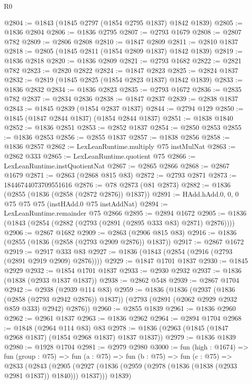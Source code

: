 \begin{lexlean}{R0}
\begin{coremodule}
@2804 := @1843 (@1845 @2797 (@1854 @2795 @1837) @1842 @1839)
@2805 := @1836 @2804
@2806 := @1836 @2795
@2807 := @2793 @1679
@2808 := @2807 @782
@2809 := @2806 @2808
@2810 := @1847 @2809
@2811 := @2810 @1837
@2818 := @2805 (@1845 @2811 (@1854 @2809 @1837) @1842 @1839)
@2819 := @1836 @2818
@2820 := @1836 @2809
@2821 := @2793 @1682
@2822 := @2821 @782
@2823 := @2820 @2822
@2824 := @1847 @2823
@2825 := @2824 @1837
@2832 := @2819 (@1845 @2825 (@1854 @2823 @1837) @1842 @1839)
@2833 := @1836 @2832
@2834 := @1836 @2823
@2835 := @2793 @1672
@2836 := @2835 @782
@2837 := @2834 @2836
@2838 := @1847 @2837
@2839 := @2838 @1837
@2843 := @1845 @2839 (@1854 @2837 @1837)
@2844 := @2794 @129
@2850 := @1845 (@1847 @2844 @1837) (@1854 @2844 @1837)
@2851 := @1838 @1840
@2852 := @1836 @2851
@2853 := @2852 @1837
@2854 := @2850 @2853
@2855 := @1836 @2853
@2856 := @2855 @1837
@2857 := @1838 @2856
@2858 := @1836 @2857
@2862 := LexLeanRuntime.multiply @75 instMulNat
@2863 := @2862 @333
@2865 := LexLeanRuntime.quotient @75
@2866 := LexLeanRuntime.instQuotientNat
@2867 := @2865 @2866
@2868 := @2867 @1679
@2871 := @2863 (@2868 @815 @83)
@2872 := @2793 @2871
@2873 := 18446744073709551616
@2876 := @78 @2873 (@81 @2873)
@2882 := @1836 (@2855 (@1836 (@2858 (@2872 @2876)) @1837))
@2891 := HAdd.hAdd.{0, 0, 0} @75 @75 @75 (instHAdd.{0} @75 instAddNat)
@2894 := LexLeanRuntime.remainder @75 @2866
@2895 := @2894 @1672
@2905 := @1836 (@1843 (@2854 (@2882 (@2793 (@2891 (@2895 @333 @83) @2871) @2876))))
@2906 := @2867 @1682
@2909 := @2863 (@2906 @815 @83)
@2916 := @1836 (@2855 (@1836 (@2858 (@2793 @2909 @2876)) @1837))
@2917 := @2867 @1672
@2919 := @2917 @333 @83
@2927 := @1836 (@1843 (@2854 (@2916 (@2793 (@2891 @2919 @2909) @2876))))
@2929 := @1847 @1701 @1837
@2930 := @1845 @2929
@2932 := @1854 @1701 @1837
@2933 := @2930 @2932
@2937 := @1836 (@1838 (@2933 @1837 @1837))
@2938 := @2862 @548
@2939 := @2867 @1704
@2942 := @2938 (@2939 @114 @83)
@2959 := @1836
    (@1836
      (@2937 (@1836 (@2858 (@2793 @2942 @2876)) @1837))
      (@2793 (@2891 (@2062 @2929 @2932 @859 @333) @2942) @2876))
@2960 := @2855 @1839
@2961 := @1836 @2960
@2962 := @2961 @1837
@2963 := @1836 @2962
@2964 := @2894 @1704
@2968 := @1848 (@2964 @114 @83) @83
@2978 := @1836 (@2963 (@1845 (@1847 @2968 @1837) (@1854 @2968 @1837) @1837 @1837))
@2979 := @1836 @1839
@2980 := @1928 @1704
@2981 := @2979 @2980
@3000 := fun (high : @1674) =>
  fun (group : @75) =>
  fun (a : @75) =>
  fun (b : @75) =>
  fun (c : @75) =>
  @2833
    (@2843
      (@2905 (@2927 (@1836 (@2959 (@2978 (@1836 (@1838 (@2933 @2981 @1837)) @1840))) @1837)))
      @1839)

\end{coremodule}
\end{lexlean}
